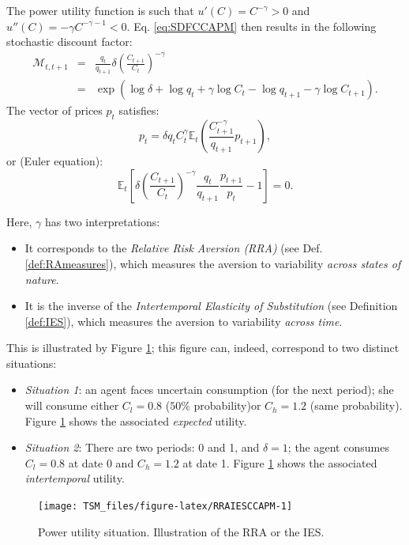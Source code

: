 \documentclass[
  12pt,
]{book}
\providecommand{\tightlist}{%
  \setlength{\itemsep}{0pt}\setlength{\parskip}{0pt}}
\theoremstyle{definition}
\theoremstyle{definition}
\theoremstyle{definition}
\theoremstyle{definition}
\theoremstyle{remark}
\begin{document}
The power utility function is such that \(u'(C) = C^{-\gamma} > 0\) and \(u''(C) = - \gamma C^{-\gamma-1} < 0\). Eq. \eqref{eq:SDFCCAPM} then results in the following stochastic discount factor:
\begin{eqnarray}
\mathcal{M}_{t,t+1} &=&  \frac{q_t}{q_{t+1}} \delta \left(
\frac{C_{t+1}}{C_t} \right)^{-\gamma} \nonumber\\
&=& \exp(\log
\delta + \log q_t + \gamma \log  C_t - \log  q_{t+1} - \gamma
\log  C_{t+1}).\label{eq:powerutilSDF}
\end{eqnarray}
The vector of prices \(p_t\) satisfies:
\[
p_t = \delta q_t C^\gamma_t \mathbb{E}_t \left(
\frac{C^{-\gamma}_{t+1}}{q_{t+1}} p_{t+1}
\right),
\]
or (Euler equation):
\[
\mathbb{E}_t\left[
\delta\left(
\frac{C_{t+1}}{C_t}
\right)^{-\gamma}  \frac{q_t}{q_{t+1}}
\frac{p_{t+1}}{p_t} - 1
\right] = 0.
\]

Here, \(\gamma\) has two interpretations:

\begin{itemize}
\tightlist
\item
  It corresponds to the \emph{Relative Risk Aversion (RRA)} (see Def. \ref{def:RAmeasures}), which measures the aversion to variability \emph{across states of nature}.
\item
  It is the inverse of the \emph{Intertemporal Elasticity of Substitution} (see Definition \ref{def:IES}), which measures the aversion to variability \emph{across time}.
\end{itemize}

This is illustrated by Figure \ref{fig:RRAIESCCAPM}; this figure can, indeed, correspond to two distinct situations:

\begin{itemize}
\tightlist
\item
  \emph{Situation 1}: an agent faces uncertain consumption (for the next period); she will consume either \(C_l= 0.8\) (\(50\%\) probability)or \(C_h= 1.2\) (same probability). Figure \ref{fig:RRAIESCCAPM} shows the associated \emph{expected} utility.
\item
  \emph{Situation 2}: There are two periods: 0 and 1, and \(\delta=1\); the agent consumes \(C_l=0.8\) at date 0 and \(C_h=1.2\) at date 1. Figure \ref{fig:RRAIESCCAPM} shows the associated \emph{intertemporal} utility.
\end{itemize}

\begin{figure}
\texttt{[image: TSM\_files/figure-latex/RRAIESCCAPM-1]} \caption{Power utility situation. Illustration of the RRA or the IES.}\label{fig:RRAIESCCAPM}
\end{figure}
\end{document}
